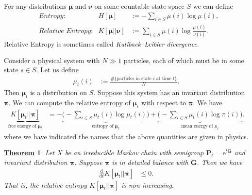 \documentclass[12pt]{book}
\numberwithin{equation}{chapter}
\theoremstyle{plain}
\newtheorem{theorem}{\underline{Theorem}}
\numberwithin{theorem}{section}
\theoremstyle{definition}
\numberwithin{exercise}{chapter}
\newcommand{\<}{\langle}
\renewcommand{\>}{\rangle}
\renewcommand{\(}{\left(}
\renewcommand{\)}{\right)}
\renewcommand{\[}{\left[}
\renewcommand{\]}{\right]}
\newcommand\Gv{\pmb{G}}
\newcommand\Pv{\pmb{P}}
\newcommand\muv{\pmb{\mu}}
\newcommand\nuv{\pmb{\nu}}
\newcommand\piv{\pmb{\pi}}
\newcommand\dd{\mathrm{d}}
\newcommand\ee{\mathrm{e}}
\begin{document}
\noindent
For any distributions $\muv$ and $\nuv$ on some countable state space $S$ we can define
\begin{align}
	&\textit{Entropy}:&
H[\muv]
	&:=	- \sum_{i \in S} \mu(i) \log \mu(i) , \\
	&\textit{Relative Entropy}:&
K[\muv||\nuv]
	&:=	\sum_{i \in S} \mu(i) \log \frac{\mu(i)}{\nu(i)} .
\end{align}
Relative Entropy is sometimes called \textit{Kullback–Leibler divergence}.

\noindent
Consider a physical system with $N \gg 1$ particles, each of which must be in some state $s \in S$.
Let us define 
\begin{align}
\mu_t(i) 
	&:= \frac{\# \{ \text{particles in state $i$ at time $t$} \}}{N}   .
\end{align}
Then $\muv_t$ is a distribution on $S$.
Suppose this system has an invariant distribution $\piv$.
We can compute the relative entropy of $\muv_t$ with respect to $\piv$.  We have
\begin{align}
\underbrace{ K[\muv_t||\piv] }_{\text{free energy of $\muv_t$}}
	&=	- \underbrace{ \Big( - \sum_{i \in S} \mu_t(i) \log \mu_t(i) \Big) }_{\text{entropy of $\muv_t$}} + \underbrace{ \Big( - \sum_{i \in S} \mu_t(i) \log \pi(i) \Big) }_{\text{mean energy of $\mu_t$}}.
\end{align}
where we have indicated the names that the above quantities are given in physics.

\begin{theorem}
Let $X$ be an irreducible Markov chain with semigroup $\Pv_t = \ee^{t \Gv}$ and invariant distribution $\piv$.  Suppose $\piv$ is in detailed balance with $\Gv$.  Then we have
\begin{align}
\frac{\dd}{\dd t} K[\muv_t||\piv] &\leq 0 .
\end{align}
That is, the relative entropy $K[\muv_t||\piv]$ is non-increasing.
\end{theorem}
\end{document}

